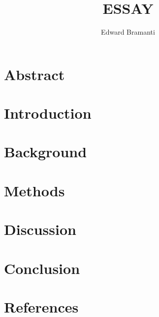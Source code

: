\documentclass[11pt]{article}
\title{ESSAY}
\author{Edward Bramanti}
\begin{document}
\maketitle
\section{Abstract}
\section{Introduction}
\section{Background}
\section{Methods}
\section{Discussion}
\section{Conclusion}
\section{References}
\end{document}
